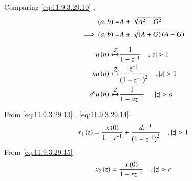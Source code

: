 \documentclass[journal,12pt,twocolumn]{IEEEtran}
\begin{document}
\noindent Comparing \eqref{eq:11.9.3.29.10} ,  
\begin{align}
\left(a,b\right) =& A \pm \sqrt{A^2 - G^2} \\
\implies \left(a,b\right) =& A \pm \sqrt{\left(A + G\right)\left(A - G\right)}
\end{align}

\begin{align}
u\left(n\right) \xleftrightarrow{\mathcal{Z}} &\frac{1}{1 - z^{-1}} \quad , \left\vert z\right\vert > 1  \label{eq:11.9.3.29.13}\\
nu\left(n\right) \xleftrightarrow{\mathcal{Z}} &\frac{z^{-1}}{\left(1 - z^{-1}\right)^2} \quad , \left\vert z\right\vert > 1  \label{eq:11.9.3.29.14}\\
a^{n}u\left(n\right) \xleftrightarrow{\mathcal{Z}} &\frac{1}{1 - az^{-1}} \quad , \left\vert z\right\vert > a \label{eq:11.9.3.29.15}
\end{align}

From  \eqref{eq:11.9.3.29.13} , \eqref{eq:11.9.3.29.14}
\begin{align}
x_1\left(z\right) = \frac{x\left(0\right)}{1 - z^{-1}} + \frac{dz^{-1}}{\left(1 - z^{-1}\right)^2} \quad , \left\vert z\right\vert > 1 
\end{align}
From \eqref{eq:11.9.3.29.15}
\begin{align}
x_2\left(z\right) = \frac{x\left(0\right)}{1 - rz^{-1}} \quad , \left\vert z\right\vert > r
\end{align}
\end{document}
